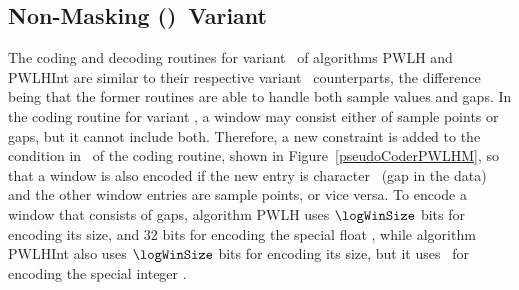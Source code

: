 

\subsection{Non-Masking (\NOmaskalgo)\ Variant}
\label{algo:pwhl:nmvariant}


The coding and decoding routines for variant \NOmaskalgo\ of algorithms PWLH and PWLHInt are similar to their respective variant \maskalgo\ counterparts, the difference being that the former routines are able to handle both sample values and gaps. In the coding routine for variant \NOmaskalgo, a window may consist either of sample points or gaps, but it cannot include both. Therefore, a new constraint is added to the condition in \condLinePWLH\ of the coding routine, shown in Figure~\ref{pseudoCoderPWLHM}, so that a window is also encoded if the new entry is character \noData\ (gap in the data) and the other window entries are sample points, or vice versa. To encode a window that consists of gaps, algorithm PWLH uses $\logWinSize$ bits for encoding its size, and 32 bits for encoding the special float \nodatafloat, while algorithm PWLHInt also uses $\logWinSize$ bits for encoding its size, but it uses \tobitexp\ for encoding the special integer \nodata.

